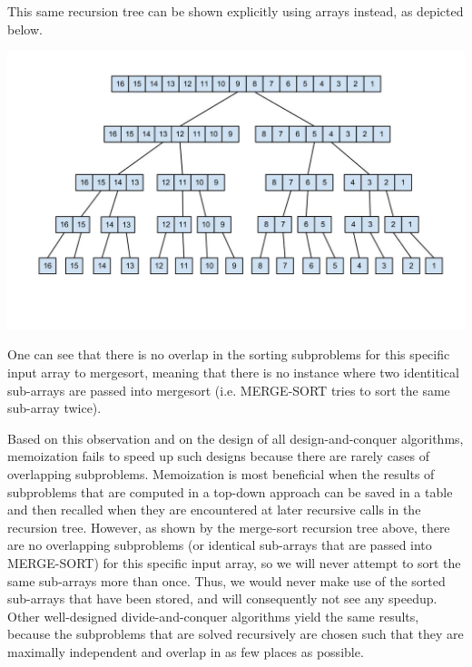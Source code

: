 \documentclass[11pt]{article}
\begin{document}
\begin{sol}
This same recursion tree can be shown explicitly using arrays instead, as depicted below.

\begin{center}
	\includegraphics[width=150mm]{msort16.jpg}
\end{center}

One can see that there is no overlap in the sorting subproblems for this specific input array to mergesort, meaning that there is no instance where two identitical sub-arrays are passed into mergesort (i.e. MERGE-SORT tries to sort the same sub-array twice). 

Based on this observation and on the design of all design-and-conquer algorithms, memoization fails to speed up such designs because there are rarely cases of overlapping subproblems. Memoization is most beneficial when the results of subproblems that are computed in a top-down approach can be saved in a table and then recalled when they are encountered at later recursive calls in the recursion tree. However, as shown by the merge-sort recursion tree above, there are no overlapping subproblems (or identical sub-arrays that are passed into MERGE-SORT) for this specific input array, so we will never attempt to sort the same sub-arrays more than once. Thus, we would never make use of the sorted sub-arrays that have been stored, and will consequently not see any speedup. Other well-designed divide-and-conquer algorithms yield the same results, because the subproblems that are solved recursively are chosen such that they are maximally independent and overlap in as few places as possible. 
\end{sol}
\end{document}
